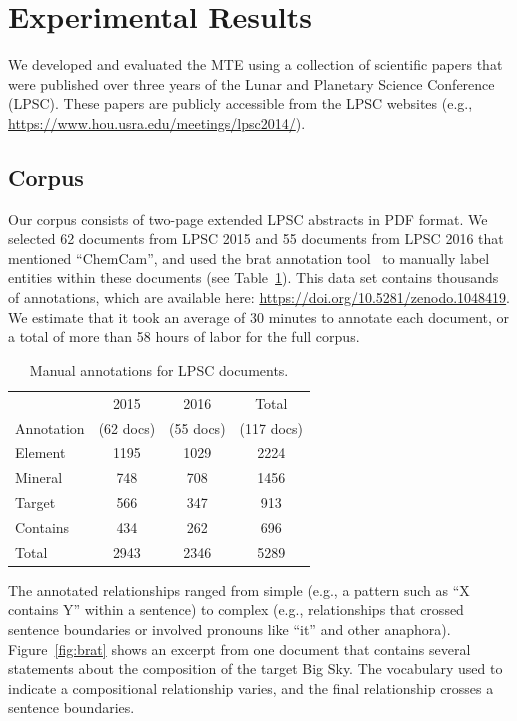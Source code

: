 \documentclass[letterpaper]{article} %
\begin{document}
\section{Experimental Results}

We developed and evaluated the MTE using a collection of scientific
papers that were published over three years of the Lunar and Planetary
Science Conference (LPSC).  These papers are publicly accessible from
the LPSC websites
(e.g., \url{https://www.hou.usra.edu/meetings/lpsc2014/}). 

\subsection{Corpus}

Our corpus consists of two-page extended LPSC abstracts in PDF format.
We selected 62 documents from LPSC 2015 and 55 documents from LPSC
2016 that mentioned ``ChemCam'', and used the brat annotation
tool~\cite{brat} to manually label entities within these documents
(see Table~\ref{tab:docs}). This data set contains thousands of
annotations, which are available
here: \url{https://doi.org/10.5281/zenodo.1048419}. 
We estimate that it took an average of 30 minutes to annotate each 
document, or a total of more than 58 hours of labor for the full
corpus.  

\begin{table}
\caption{Manual annotations for LPSC documents.}
\label{tab:docs}
\begin{center}
\begin{tabular}{l|ccc}
           & 2015     & 2016     & Total \\ 
Annotation & (62 docs) & (55 docs) & (117 docs)\\ \hline
Element  & 1195 & 1029 & 2224 \\
Mineral  & 748  & 708  & 1456 \\
Target   & 566  & 347  &  913 \\ \hline
Contains & 434  & 262  &  696 \\ \hline
Total    & 2943 & 2346 & 5289 \\ \hline
\end{tabular}
\end{center}
\end{table}

The annotated relationships ranged from simple (e.g., a pattern such
as ``X contains Y'' within a sentence) to complex (e.g., relationships
that crossed sentence boundaries or involved pronouns like ``it'' and
other anaphora).  Figure~\ref{fig:brat} shows an excerpt from one
document that contains several statements about the composition of the
target Big Sky.  The vocabulary used to indicate a compositional
relationship varies, and the final relationship crosses a sentence
boundaries.  
\end{document}
